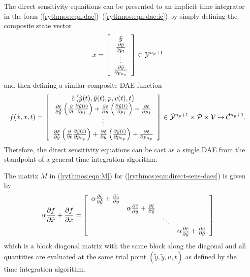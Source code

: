 \documentclass[pdf,ps2pdf,11pt]{SANDreport}
\begin{document}
The direct sensitivity equaitions can be presented to an implicit time
integrator in the form
(\ref{rythmos:eqn:dae})--(\ref{rythmos:eqn:dae:ic}) by simply
defining the composite state vector
%
\begin{equation}
x =
{\bmat{c}
\tilde{y} \\
\frac{\partial \tilde{y}}{\partial p_1} \\ \vdots \\ \frac{\partial \tilde{y}}{\partial p_{n_u}}
\emat}
\in \mathcal{Y}^{n_p+1}
\end{equation}
%
and then defining a similar composite DAE function
%
\begin{equation}
f(\dot{x},x,t) =
{\bmat{c}
%
\tilde{c}\left( \dot{\tilde{y}}(t), \tilde{y}(t), p, v(t), t \right) \\
%
\frac{\partial \tilde{c}}{\partial \dot{\tilde{y}}} \left(\frac{\partial}{\partial t} \frac{\partial \tilde{y}(t)}{\partial p_1} \right)
+ \frac{\partial \tilde{c}}{\partial y} \left(\frac{\partial \tilde{y}(t)}{\partial p_1}\right)
+ \frac{\partial \tilde{c}}{\partial p_1} \\
%
\vdots \\
%
\frac{\partial \tilde{c}}{\partial \dot{\tilde{y}}} \left(\frac{\partial}{\partial t} \frac{\partial \tilde{y}(t)}{\partial p_{n_p}} \right)
+ \frac{\partial \tilde{c}}{\partial y} \left(\frac{\partial \tilde{y}(t)}{\partial p_{n_p}}\right)
+ \frac{\partial \tilde{c}}{\partial p_{n_p}}
%
\emat}
\in \tilde{\mathcal{Y}}^{n_p+1} \times \mathcal{P} \times \mathcal{V} \rightarrow \tilde{\mathcal{C}}^{n_p+1}.
\label{rythmos:eqn:direct-sens-daes}
\end{equation}
%
Therefore, the direct sensitivity equations can be cast as a single DAE from
the standpoint of a general time integration algorithm.

The matrix $M$ in (\ref{rythmos:eqn:M}) for
(\ref{rythmos:eqn:direct-sens-daes}) is given by
%
\begin{equation}
\alpha \frac{\partial f}{\partial \dot{x}} + \frac{\partial f}{\partial x} = 
{\bmat{cccc}
\alpha \frac{\partial \tilde{c}}{\partial \dot{\tilde{y}}} + \frac{\partial \tilde{c}}{\partial \tilde{y}} \\
& \alpha \frac{\partial \tilde{c}}{\partial \dot{\tilde{y}}} + \frac{\partial \tilde{c}}{\partial \tilde{y}} \\
& & \ddots \\
& & & \alpha \frac{\partial \tilde{c}}{\partial \dot{\tilde{y}}} + \frac{\partial \tilde{c}}{\partial \tilde{y}}
\emat}
\label{rythmos:eqn:direct-sens-daes-jac}
\end{equation}
%
which is a block diagonal matrix with the same block along the diagonal and
all quantities are evaluated at the same trial point
$(\dot{\tilde{y}},\tilde{y},u,t)$ as defined by the time integration
algorithm.
\end{document}

